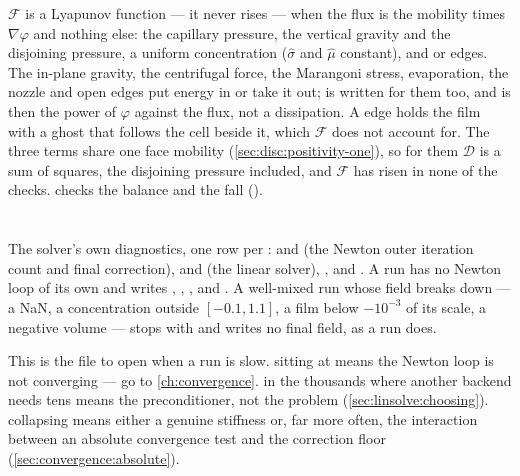 \begin{warn}
  $\mathcal F$ is a Lyapunov function --- it never rises --- when the flux
  is the mobility times $\nabla\varphi$ and nothing else: the capillary
  pressure, the vertical gravity and the disjoining pressure, a uniform
  concentration ($\hat\sigma$ and $\hat\mu$ constant), and 
  or  edges. The in-plane gravity, the centrifugal force,
  the Marangoni stress, evaporation, the nozzle and open edges put energy
  in or take it out;  is written for them too, and
   is then the power of $\varphi$ against the flux, not a
  dissipation. A  edge holds the film with a ghost that
  follows the cell beside it, which $\mathcal F$ does not account for.
  The three terms share one face mobility
  (\cref{sec:disc:positivity-one}), so for them $\mathcal D$ is a sum of
  squares, the disjoining pressure included, and $\mathcal F$ has risen in
  none of the checks.  checks the balance and the fall
  ().
\end{warn}

\section{}
\label{sec:output:calcinfo}

The solver's own diagnostics, one row per
:  and  (the
Newton outer iteration count and final correction),  and
 (the linear solver), , and .
A  run has no Newton loop of its own and writes ,
, ,  and .
A well-mixed run whose field breaks down --- a NaN, a concentration outside
$[-0.1, 1.1]$, a film below $-10^{-3}$ of its scale, a negative volume ---
stops with  and writes no final field, as a
 run does.

This is the file to open when a run is slow.  sitting at
 means the Newton loop is not converging --- go to
\cref{ch:convergence}.  in the thousands where another backend
needs tens means the preconditioner, not the problem
(\cref{sec:linsolve:choosing}).  collapsing means either a genuine
stiffness or, far more often, the interaction between an absolute convergence
test and the correction floor (\cref{sec:convergence:absolute}).

